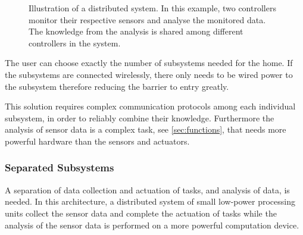 \begin{figure}[htbp]
\centering
{}
\caption[Distributed system]{Illustration of a distributed system. In this example, two controllers monitor their respective sensors and analyse the monitored data. The knowledge from the analysis is shared among different controllers in the system.}\label{fig:distributed_system}
\end{figure}

The user can choose exactly the number of subsystems needed for the home. If the subsystems are connected wirelessly, there only needs to be wired power to the subsystem therefore reducing the barrier to entry greatly.

This solution requires complex communication protocols among each individual subsystem, in order to reliably combine their knowledge. Furthermore the analysis of sensor data is a complex task, see \cref{sec:functions}, that needs more powerful hardware than the sensors and actuators.

\subsubsection{Separated Subsystems}
A separation of data collection and actuation of tasks, and analysis of data, is needed. In this architecture, a distributed system of small low-power processing units collect the sensor data and complete the actuation of tasks while the analysis of the sensor data is performed on a more powerful computation device.

